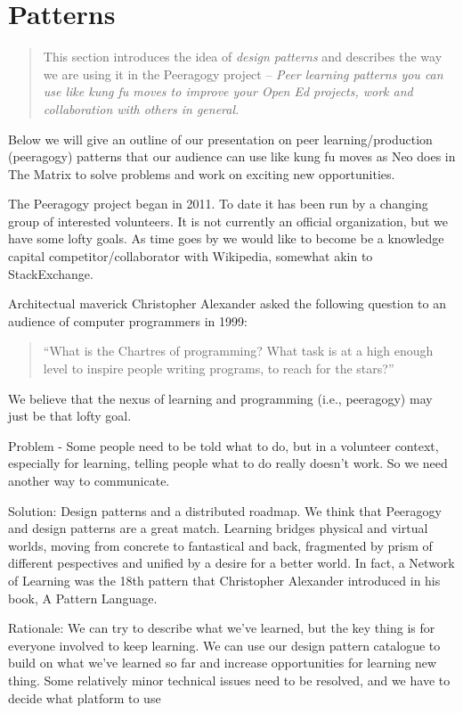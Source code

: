 \section{Patterns}
\begin{quote}
This section introduces the idea of \emph{design patterns} and describes the way we are using it in the Peeragogy project -- \emph{Peer learning patterns you can use like kung fu moves to improve your Open Ed projects, work and collaboration with others in general.}
\end{quote}

Below we will give an outline of our presentation on peer learning/production (peeragogy) patterns that our audience can use like kung fu moves as Neo does in The Matrix to solve problems and work on exciting new opportunities.

The Peeragogy project began in 2011.  To date it has been run by a changing group of interested volunteers.   It is not currently an official organization, but we have some lofty goals.  As time goes by we would like to become be a knowledge capital competitor/collaborator with Wikipedia, somewhat akin to StackExchange.

Architectual maverick Christopher Alexander asked the following question to an audience of computer programmers in 1999: 
\begin{quote}
``What is the Chartres of programming? What task is at a high enough level to inspire people writing programs, to reach for the stars?''
\end{quote}
We believe that the nexus of learning and programming (i.e., peeragogy) may just be that lofty goal.

Problem - Some people need to be told what to do, but in a volunteer context, especially for learning, telling people what to do really doesn't work.  So we need another way to communicate.

Solution: Design patterns and a distributed roadmap.
We think that Peeragogy and design patterns are a great match.  Learning bridges physical and virtual worlds, moving from concrete to fantastical and back, fragmented by prism of different pespectives and unified by a desire for a better world. In fact, a Network of Learning was the 18th pattern that Christopher Alexander introduced in his book, A Pattern Language.

Rationale:
We can try to describe what we've learned, but the key thing is for everyone involved to keep learning. We can use our design pattern catalogue to build on what we've learned so far and increase opportunities for learning new thing.
Some relatively minor technical issues need to be resolved, and we
have to decide what platform to use

